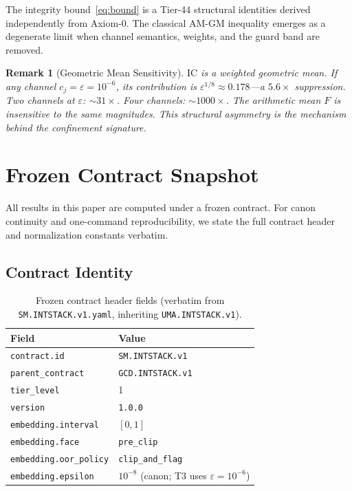 \documentclass[
  aps,
  prd,
  twocolumn,
  superscriptaddress,
  nofootinbib,
  floatfix
]{revtex4-2}
\newtheorem{remark}{Remark}
\newcommand{\eps}{\varepsilon}
\newcommand{\IC}{\mathrm{IC}}
\begin{document}
The integrity bound~\eqref{eq:bound} is a Tier-44 structural identities derived independently from Axiom-0.  The classical
AM-GM inequality emerges as a degenerate limit when channel
semantics, weights, and the guard band are removed.

\begin{remark}[Geometric Mean Sensitivity]\label{rem:sensitivity}
$\IC$ is a weighted geometric mean.  If any channel
$c_j = \eps = 10^{-6}$, its contribution is
$\eps^{1/8} \approx 0.178$---a $5.6\times$ suppression.
Two channels at $\eps$: $\sim 31\times$.
Four channels: $\sim 1000\times$.
The arithmetic mean $F$ is insensitive to the same magnitudes.
This structural asymmetry is the mechanism behind the
confinement signature.
\end{remark}


\section{Frozen Contract Snapshot}\label{sec:contract}

All results in this paper are computed under a frozen contract.
For canon continuity and one-command reproducibility, we state
the full contract header and normalization constants verbatim.

\subsection{Contract Identity}

\begin{table}[H]
\caption{Frozen contract header fields (verbatim from
\texttt{SM.INTSTACK.v1.yaml}, inheriting
\texttt{UMA.INTSTACK.v1}).}
\label{tab:contract}
\centering\small
\begin{tabular}{@{}ll@{}}
\toprule
\textbf{Field} & \textbf{Value} \\
\midrule
\texttt{contract.id}        & \texttt{SM.INTSTACK.v1} \\
\texttt{parent\_contract}    & \texttt{GCD.INTSTACK.v1} \\
\texttt{tier\_level}         & 1 \\
\texttt{version}             & \texttt{1.0.0} \\
\texttt{embedding.interval}  & $[0, 1]$ \\
\texttt{embedding.face}      & \texttt{pre\_clip} \\
\texttt{embedding.oor\_policy} & \texttt{clip\_and\_flag} \\
\texttt{embedding.epsilon}   & $10^{-8}$ (canon; T3 uses $\eps = 10^{-6}$) \\
\bottomrule
\end{tabular}
\end{table}
\end{document}
